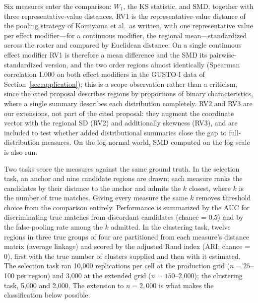 \documentclass[AMA,Times1COL]{WileyNJDv5}
\begin{document}
Six measures enter the comparison: $W_1$, the KS statistic, and SMD, together with three representative-value distances. RV1 is the representative-value distance of the pooling strategy of Komiyama et al.\ as written, with one representative value per effect modifier---for a continuous modifier, the regional mean---standardized across the roster and compared by Euclidean distance.\cite{komiyama2024} On a single continuous effect modifier RV1 is therefore a mean difference and the SMD its pairwise-standardized version, and the two order regions almost identically (Spearman correlation 1.000 on both effect modifiers in the GUSTO-I data of Section~\ref{sec:application}); this is a scope observation rather than a criticism, since the cited proposal describes regions by proportions of binary characteristics, where a single summary describes each distribution completely. RV2 and RV3 are our extensions, not part of the cited proposal: they augment the coordinate vector with the regional SD (RV2) and additionally skewness (RV3), and are included to test whether added distributional summaries close the gap to full-distribution measures. On the log-normal world, SMD computed on the log scale is also run.

Two tasks score the measures against the same ground truth. In the selection task, an anchor and nine candidate regions are drawn; each measure ranks the candidates by their distance to the anchor and admits the $k$ closest, where $k$ is the number of true matches. Giving every measure the same $k$ removes threshold choice from the comparison entirely. Performance is summarized by the AUC for discriminating true matches from discordant candidates (chance = 0.5) and by the false-pooling rate among the $k$ admitted. In the clustering task, twelve regions in three true groups of four are partitioned from each measure's distance matrix (average linkage) and scored by the adjusted Rand index (ARI; chance = 0), first with the true number of clusters supplied and then with it estimated. The selection task ran 10{,}000 replications per cell at the production grid ($n = 25$--100 per region) and 3{,}000 at the extended grid ($n = 150$--2{,}000); the clustering task, 5{,}000 and 2{,}000. The extension to $n = 2{,}000$ is what makes the classification below possible.
\end{document}
